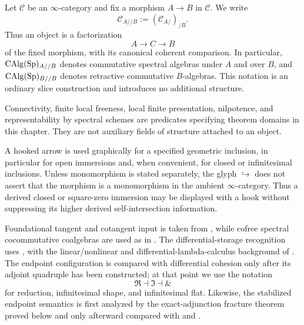 \begin{convention}
\label{conv:deformation-under-over}
Let \(\mathcal C\) be an \(\infty\)-category and fix a morphism
\(A\to B\) in \(\mathcal C\). We write
\[
    \mathcal C_{A//B}:=(\mathcal C_{A/})_{/B}.
\]
Thus an object is a factorization
\[
    A\longrightarrow C\longrightarrow B
\]
of the fixed morphism, with its canonical coherent comparison. In
particular, \(\operatorname{CAlg}(\operatorname{Sp})_{A//B}\) denotes commutative spectral algebras under
\(A\) and over \(B\), and \(\operatorname{CAlg}(\operatorname{Sp})_{B//B}\) denotes retractive
commutative \(B\)-algebras. This notation is an ordinary slice construction
and introduces no additional structure.
\end{convention}

\begin{convention}
\label{conv:deformation-theorem-domains}
Connectivity, finite local freeness, local finite presentation, nilpotence,
and representability by spectral schemes are predicates specifying theorem
domains in this chapter. They are not auxiliary fields of structure attached
to an object.
\end{convention}


\begin{convention}
\label{conv:deformation-hooked-arrows}
A hooked arrow is used graphically for a specified geometric inclusion, in
particular for open immersions and, when convenient, for closed or
infinitesimal inclusions. Unless monomorphism is stated separately, the glyph
\(\hookrightarrow\) does not assert that the morphism is a monomorphism in the
ambient \(\infty\)-category. Thus a derived closed or square-zero immersion
may be displayed with a hook without suppressing its higher derived
self-intersection information.
\end{convention}

Foundational tangent and cotangent input is taken from
\cite{LurieHigherAlgebra,LurieDAGIV,LurieSAG}, while cofree spectral
cocommutative coalgebras are used as in
\cite{BachmannBurklund2026Coalgebras}. The differential-storage recognition
uses \cite{BluteCockettSeely2006Differential,Lemay2021Coderelictions},
with the linear/nonlinear and differential-lambda-calculus background of
\cite{Benton1995LNL,EhrhardRegnier2003Differential}. The endpoint
configuration is compared with differential cohesion only after its adjoint
quadruple has been constructed; at that point we use the notation
\[
    \Re\dashv\Im\dashv\&
\]
for reduction, infinitesimal shape, and infinitesimal flat. Likewise, the
stabilized endpoint semantics is first analyzed by the exact-adjunction
fracture theorem proved below and only afterward compared with
\cite[Sections~2--3]{BunkeNikolausVoelkl} and
\cite{HopkinsSinger2005}.

